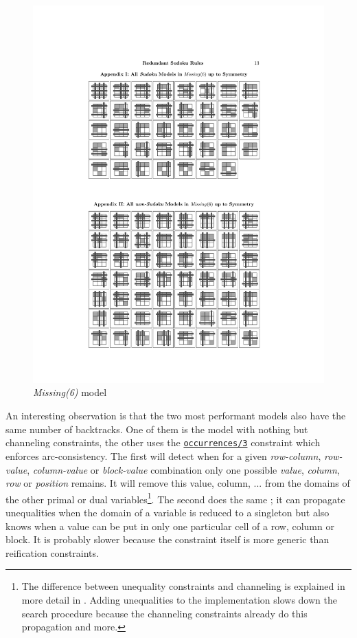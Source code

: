 \begin{figure}[H]
\centering
\includegraphics{misc/missing6}
\caption{\textit{Missing(6)} model}
\label{fig:missing6}
\end{figure}

An interesting observation is that the two most performant models also have the same number of backtracks. One of them is the model with nothing but channeling constraints, the other uses the \href{http://eclipseclp.org/doc/bips/lib/ic_global/occurrences-3.html}{\texttt{occurrences/3}} constraint which enforces arc-consistency. The first will detect when for a given \textit{row-column}, \textit{row-value}, \textit{column-value} or \textit{block-value} combination only one possible \textit{value}, \textit{column}, \textit{row} or \textit{position} remains. It will remove this value, column, ... from the domains of the other primal or dual variables\footnote{The difference between unequality constraints and channeling is explained in more detail in \cite{article:channeling}. Adding unequalities to the implementation slows down the search procedure because the channeling constraints already do this propagation and more.}. The second does the same ; it can propagate unequalities when the domain of a variable is reduced to a singleton but also knows when a value can be put in only one particular cell of a row, column or block. It is probably slower because the constraint itself is more generic than reification constraints.\\\par

